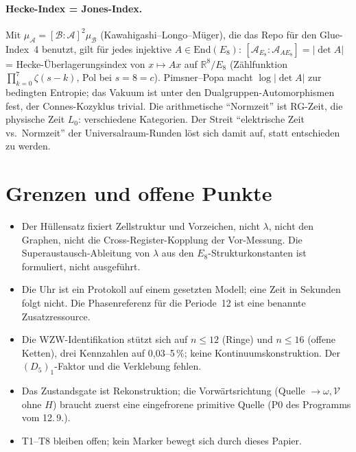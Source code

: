 \paragraph{Hecke-Index = Jones-Index.} Mit $\mu_{\mathcal A}=[\mathcal B:\mathcal A]^2\mu_{\mathcal B}$ (Kawahigashi--Longo--Müger), die das Repo für den Glue-Index~4 benutzt, gilt für jedes injektive $A\in\mathrm{End}(E_8)$: $[\mathcal A_{E_8}:\mathcal A_{AE_8}]=|\det A|$ = Hecke-Überlagerungsindex von $x\mapsto Ax$ auf $\mathbb R^8/E_8$ (Zählfunktion $\prod_{k=0}^7\zeta(s-k)$, Pol bei $s=8=c$). Pimsner--Popa macht $\log|\det A|$ zur bedingten Entropie; das Vakuum ist unter den Dualgruppen-Automorphismen fest, der Connes-Kozyklus trivial. Die arithmetische \enquote{Normzeit} ist RG-Zeit, die physische Zeit $L_0$: verschiedene Kategorien. Der Streit \enquote{elektrische Zeit vs.\ Normzeit} der Universalraum-Runden löst sich damit auf, statt entschieden zu werden.

\section{Grenzen und offene Punkte}
\begin{itemize}[leftmargin=*]
\item Der Hüllensatz fixiert Zellstruktur und Vorzeichen, nicht $\lambda$, nicht den Graphen, nicht die Cross-Register-Kopplung der Vor-Messung. Die Superaustausch-Ableitung von $\lambda$ aus den $E_8$-Strukturkonstanten ist formuliert, nicht ausgeführt.
\item Die Uhr ist ein Protokoll auf einem gesetzten Modell; eine Zeit in Sekunden folgt nicht. Die Phasenreferenz für die Periode~12 ist eine benannte Zusatzressource.
\item Die WZW-Identifikation stützt sich auf $n\le12$ (Ringe) und $n\le16$ (offene Ketten), drei Kennzahlen auf 0{,}03--5\,\%; keine Kontinuumskonstruktion. Der $(D_5)_1$-Faktor und die Verklebung fehlen.
\item Das Zustandsgate ist Rekonstruktion; die Vorwärtsrichtung (Quelle $\to\omega,\mathcal V$ ohne $H$) braucht zuerst eine eingefrorene primitive Quelle (P0 des Programms vom 12.\,9.).
\item T1--T8 bleiben offen; kein Marker bewegt sich durch dieses Papier.
\end{itemize}

